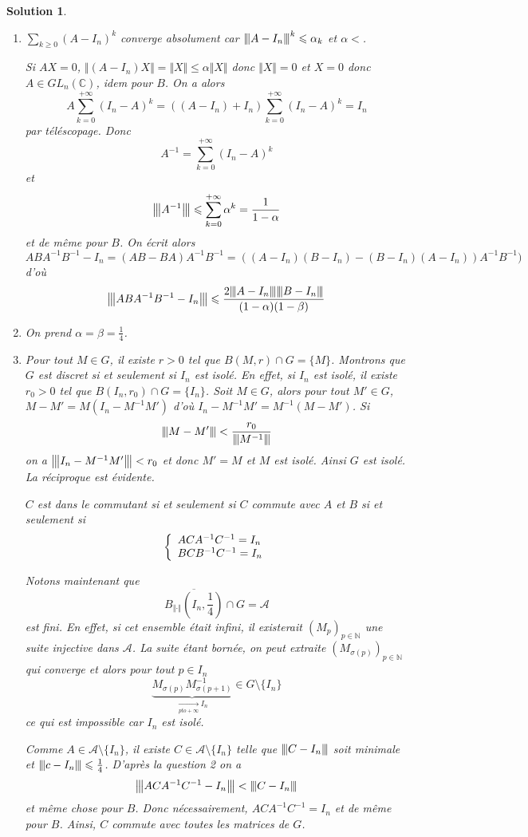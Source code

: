 \documentclass[12pt]{article}
\newtheorem{solution}{Solution}[section]
\theoremstyle{remark}
\newcommand{\C}{\mathbb{C}} \newcommand{\Q}{\mathbb{Q}}
\newcommand{\N}{\mathbb{N}} \newcommand{\Z}{\mathbb{Z}}
\newcommand{\vertiii}[1]{{\left\vert\kern-0.25ex\left\vert\kern-0.25ex\left\vert{}#1
\right\vert\kern-0.25ex\right\vert\kern-0.25ex\right\vert}}
\begin{document}
\begin{solution}
	\phantom{}
	\begin{enumerate}
		\item $\sum_{k\geqslant0}(A-I_{n})^{k}$ converge absolument car $\vertiii{A-I_{n}}^{k}\leqslant\alpha_{k}$ et $\alpha<$.
		
		Si $AX=0$, $\Vert (A-I_{n})X\Vert=\Vert X\Vert\leqslant\alpha\Vert X\Vert$ donc $\Vert X\Vert=0$ et $X=0$ donc $A\in GL_{n}(\C)$, idem pour $B$. On a alors
		\begin{equation*}
			A\sum_{k=0}^{+\infty}(I_{n}-A)^{k}=((A-I_{n})+I_{n})\sum_{k=0}^{+\infty}(I_{n}-A)^{k}=I_{n}
		\end{equation*}
		par téléscopage. Donc 
		$$A^{-1}=\sum_{k=0}^{+\infty}(I_{n}-A)^{k}$$
		et
		$$\vertiii{A^{-1}}\leqslant\sum_{k=0}^{+\infty}\alpha^{k}=\frac{1}{1-\alpha}$$
		et de même pour $B$. On écrit alors
		$$ABA^{-1}B^{-1}-I_{n}=(AB-BA)A^{-1}B^{-1}=((A-I_{n})(B-I_{n})-(B-I_{n})(A-I_{n}))A^{-1}B^{-1})$$
		d'où
		$$\vertiii{ABA^{-1}B^{-1}-I_{n}}\leqslant\frac{2\vertiii{A-I_{n}}\vertiii{B-I_{n}}}{(1-\alpha)(1-\beta)}$$

		\item On prend $\alpha=\beta=\frac{1}{4}$.
		\item Pour tout $M\in G$, il existe $r>0$ tel que $B(M,r)\cap G=\{M\}$. Montrons que $G$ est discret si et seulement si $I_{n}$ est isolé. En effet, si $I_{n}$ est isolé, il existe $r_{0}>0$ tel que $B(I_{n},r_{0})\cap G=\{I_{n}\}$. Soit $M\in G$, alors pour tout $M'\in G$, $M-M'=M(I_{n}-M^{-1}M')$ d'où $I_{n}-M^{-1}M'=M^{-1}(M-M')$. Si 
		$$\vertiii{M-M'}<\frac{r_{0}}{\vertiii{M^{-1}}}$$
		on a $\vertiii{I_{n}-M^{-1}M'}<r_{0}$ et donc $M'=M$ et $M$ est isolé. Ainsi $G$ est isolé. La réciproque est évidente.

		$C$ est dans le commutant si et seulement si $C$ commute avec $A$ et $B$ si et seulement si
		$$
		\left\{
			\begin{array}[]{l}
				ACA^{-1}C^{-1}=I_{n}\\
				BCB^{-1}C^{-1}=I_{n}
			\end{array}
		\right.
		$$

		Notons maintenant que 
		$$\overline{B_{\Vert\cdot\Vert}(I_{n},\frac{1}{4})}\cap G=\mathcal{A}$$
		est fini. En effet, si cet ensemble était infini, il existerait $(M_{p})_{p\in\N}$ une suite injective dans $\mathcal{A}$. La suite étant bornée, on peut extraite $(M_{\sigma(p)})_{p\in\N}$ qui converge et alors pour tout $p\in I_{n}$
		$$\underbrace{M_{\sigma(p)}M_{\sigma(p+1)}^{-1}}_{\xrightarrow[pto+\infty]{}I_{n}}\in G\setminus\{I_{n}\}$$
		ce qui est impossible car $I_{n}$ est isolé.

		Comme $A\in \mathcal{A}\setminus\{I_{n}\}$, il existe $C\in\mathcal{A}\setminus\{I_{n}\}$ telle que $\vertiii{C-I_{n}}$ soit minimale et $\vertiii{c-I_{n}}\leqslant\frac{1}{4}$. D'après la question 2 on a 
		$$\vertiii{ACA^{-1}C^{-1}-I_{n}}<\vertiii{C-I_{n}}$$
		et même chose pour $B$. Donc nécessairement, $ACA^{-1}C^{-1}=I_{n}$ et de même pour $B$. Ainsi, $C$ commute avec toutes les matrices de $G$.
	\end{enumerate}
\end{solution}
\end{document}
